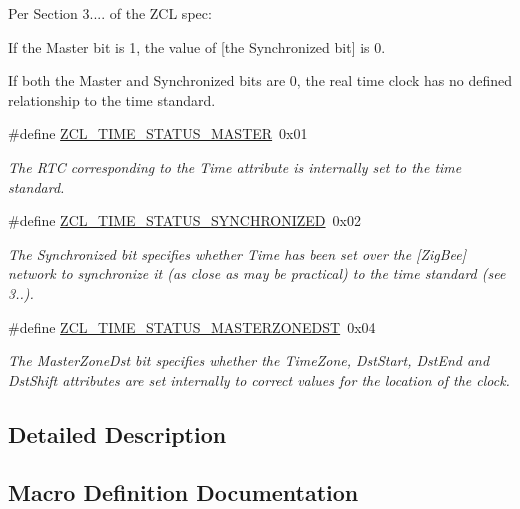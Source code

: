 Per Section 3.... of the Z\+CL spec\+:
\begin{DoxyItemize}
\item If the Master bit is 1, the value of \mbox{[}the Synchronized bit\mbox{]} is 0.
\item If both the Master and Synchronized bits are 0, the real time clock has no defined relationship to the time standard. 
\end{DoxyItemize}\begin{DoxyCompactItemize}
\item 
\#define \hyperlink{group__zcl__time_gabf057b123b136f20ade3faf065dcb298}{Z\+C\+L\+\_\+\+T\+I\+M\+E\+\_\+\+S\+T\+A\+T\+U\+S\+\_\+\+M\+A\+S\+T\+ER}~0x01
\begin{DoxyCompactList}\small\item\em The R\+TC corresponding to the Time attribute is internally set to the time standard. \end{DoxyCompactList}\item 
\#define \hyperlink{group__zcl__time_ga07fc4fc7df3e8b1b44817bcaa50b7170}{Z\+C\+L\+\_\+\+T\+I\+M\+E\+\_\+\+S\+T\+A\+T\+U\+S\+\_\+\+S\+Y\+N\+C\+H\+R\+O\+N\+I\+Z\+ED}~0x02
\begin{DoxyCompactList}\small\item\em The Synchronized bit specifies whether Time has been set over the \mbox{[}Zig\+Bee\mbox{]} network to synchronize it (as close as may be practical) to the time standard (see 3..). \end{DoxyCompactList}\item 
\#define \hyperlink{group__zcl__time_ga76367e10cd6d032aad80cdd4786c1eca}{Z\+C\+L\+\_\+\+T\+I\+M\+E\+\_\+\+S\+T\+A\+T\+U\+S\+\_\+\+M\+A\+S\+T\+E\+R\+Z\+O\+N\+E\+D\+ST}~0x04
\begin{DoxyCompactList}\small\item\em The Master\+Zone\+Dst bit specifies whether the Time\+Zone, Dst\+Start, Dst\+End and Dst\+Shift attributes are set internally to correct values for the location of the clock. \end{DoxyCompactList}\end{DoxyCompactItemize}


\subsection{Detailed Description}


\subsection{Macro Definition Documentation}
\mbox{\label{group__zcl__time_gaa45500dbe82c2beea426914014e26fff}} 
